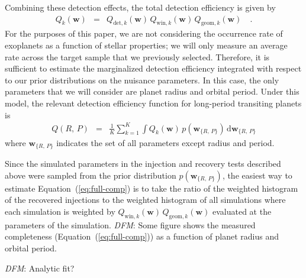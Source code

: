 \documentclass[manuscript, letterpaper]{aastex6}
\newcommand{\paper}{paper}
\renewcommand{\eqref}[1]{\ref{eq:#1}}
\newcommand{\Eq}[1]{Equation~(\eqref{#1})}
\newcommand{\eq}[1]{\Eq{#1}}
\newcommand{\eqlabel}[1]{\label{eq:#1}}
\newcommand{\dd}{\ensuremath{\,\mathrm{d}}}
\newcommand{\bvec}[1]{{\ensuremath{\boldsymbol{#1}}}}
\newcommand{\todo}[3]{{\color{#2}\emph{#1}: #3}}
\newcommand{\dfmtodo}[1]{\todo{DFM}{red}{#1}}
\newcommand{\params}{{\ensuremath{\bvec{w}}}}
\begin{document}
Combining these detection effects, the total detection efficiency is given by
\begin{eqnarray}
Q_k(\params) &=& Q_{\mathrm{det},k}(\params) \,
                 Q_{\mathrm{win},k} (\params) \,
                 Q_{\mathrm{geom},k} (\params) \quad.
\end{eqnarray}
For the purposes of this \paper, we are not considering the occurrence rate of
exoplanets as a function of stellar properties; we will only measure an
average rate across the target sample that we previously selected.
Therefore, it is sufficient to estimate the marginalized detection efficiency
integrated with respect to our prior distributions on the nuisance parameters.
In this case, the only parameters that we will consider are planet radius and
orbital period.
Under this model, the relevant detection efficiency function for long-period
transiting planets is
\begin{eqnarray}\eqlabel{full-comp}
Q(R,\,P) &=& \frac{1}{K} \sum_{k=1}^{K} \int Q_k(\params) \,
    p(\params_{\{R,\,P\}}) \dd\params_{\{R,\,P\}}
\end{eqnarray}
where $\params_{\{R,\,P\}}$ indicates the set of all parameters except radius
and period.

Since the simulated parameters in the injection and recovery tests described
above were sampled from the prior distribution $p(\params_{\{R,\,P\}})$, the
easiest way to estimate \eq{full-comp} is to take the ratio of the weighted
histogram of the recovered injections to the weighted histogram of all
simulations where each simulation is weighted by
$Q_{\mathrm{win},k} (\params) \, Q_{\mathrm{geom},k} (\params)$ evaluated at
the parameters of the simulation.
\dfmtodo{Some figure} shows the measured completeness (\eq{full-comp}) as a
function of planet radius and orbital period.

\dfmtodo{Analytic fit?}
\end{document}
